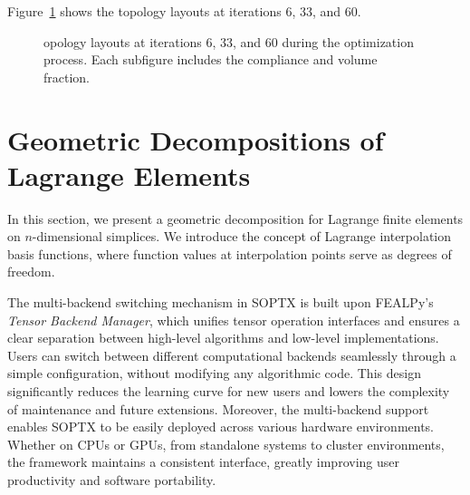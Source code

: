 \documentclass[mathpazo]{cicp}
\begin{document}
Figure~\ref{fig:canti_1_all} shows the topology layouts at iterations 6, 33, and 60.
\begin{figure}[htp]
	\centering
	\caption{opology layouts at iterations 6, 33, and 60 during the optimization process. Each subfigure includes the compliance and volume fraction.}
	\label{fig:canti_1_all}
\end{figure}



\section{Geometric Decompositions of Lagrange Elements}\label{sec:lagrange}
In this section, we present a geometric decomposition for Lagrange finite elements on $n$-dimensional simplices. We introduce the concept of Lagrange interpolation basis functions, where function values at interpolation points serve as degrees of freedom.

The multi-backend switching mechanism in SOPTX is built upon FEALPy’s \textit{Tensor Backend Manager}, which unifies tensor operation interfaces and ensures a clear separation between high-level algorithms and low-level implementations. Users can switch between different computational backends seamlessly through a simple configuration, without modifying any algorithmic code. This design significantly reduces the learning curve for new users and lowers the complexity of maintenance and future extensions. Moreover, the multi-backend support enables SOPTX to be easily deployed across various hardware environments. Whether on CPUs or GPUs, from standalone systems to cluster environments, the framework maintains a consistent interface, greatly improving user productivity and software portability.
\end{document}
